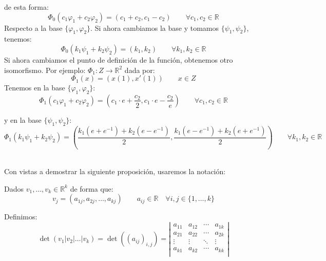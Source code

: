 \begin{ejemplo}
    de esta forma:
    \begin{equation*}
        \Phi_0(c_1\varphi_1 + c_2\varphi_2) = (c_1 + c_2, c_1 - c_2) \qquad \forall c_1,c_2\in \mathbb{R}
    \end{equation*}
    Respecto a la base $\{\varphi_1, \varphi_2\}$. Si ahora cambiamos la base y tomamos $\{\psi_1,\psi_2\}$, tenemos:
    \begin{equation*}
        \Phi_0(k_1\psi_1 + k_2\psi_2) = (k_1, k_2) \qquad \forall k_1,k_2\in \mathbb{R}
    \end{equation*}
    Si ahora cambiamos el punto de definición de la función, obtenemos otro isomorfismo. Por ejemplo: $\Phi_1:Z\rightarrow\mathbb{R}^2$ dada por:
    \begin{equation*}
        \Phi_1(x) = (x(1), x'(1)) \qquad x\in Z
    \end{equation*}
    Tenemos en la base $\{\varphi_1,\varphi_2\}$:
    \begin{equation*}
        \Phi_1(c_1\varphi_1+c_2\varphi_2) = \left(c_1\cdot e + \dfrac{c_2}{2}, c_1\cdot e - \dfrac{c_2}{e}\right) \qquad \forall c_1,c_2\in \mathbb{R}
    \end{equation*}

    y en la base $\{\psi_1,\psi_2\}$:
    \begin{equation*}
        \Phi_1(k_1\psi_1 + k_2\psi_2) = \left(\dfrac{k_1(e+e^{-1})+k_2(e-e^{-1})}{2}, \dfrac{k_1(e-e^{-1})+k_2(e+e^{-1})}{2}\right) \qquad \forall k_1,k_2\in \mathbb{R}
    \end{equation*}
\end{ejemplo}~\\

Con vistas a demostrar la siguiente proposición, usaremos la notación:
\begin{notacion}
    Dados $v_1,\ldots,v_k\in \mathbb{R}^k$ de forma que:
    \begin{equation*}
        v_j = (a_{1j}, a_{2j}, \ldots, a_{kj}) \qquad a_{ij}\in \mathbb{R} \quad \forall i,j\in \{1,\ldots,k\}
    \end{equation*}

    Definimos:
    \begin{equation*}
        \det(v_1|v_2|\ldots|v_k) = \det((a_{ij})_{i,j}) = \left|\begin{array}{cccc}
            a_{11} & a_{12} & \cdots & a_{1k} \\
            a_{21} & a_{22} & \cdots & a_{2k} \\
            \vdots & \vdots & \ddots & \vdots \\
            a_{k1} & a_{k2} & \cdots & a_{kk} \\
        \end{array}\right|
    \end{equation*}
\end{notacion}

